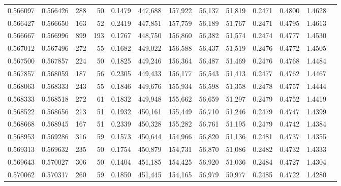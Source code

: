\begin{tabular}{rrrrrrrrrrrrr}
0.566097 & 0.566426 &    288 &    50 &                                     0.1479 & 447,688 & 157,922 &  56,137 &  51,819 & 0.2471 & 0.4800 & 1.4628 \\
0.566427 & 0.566650 &    163 &    52 &                                     0.2419 & 447,851 & 157,759 &  56,189 &  51,767 & 0.2471 & 0.4795 & 1.4613 \\
0.566667 & 0.566996 &    899 &   193 &                                     0.1767 & 448,750 & 156,860 &  56,382 &  51,574 & 0.2474 & 0.4777 & 1.4530 \\
0.567012 & 0.567496 &    272 &    55 &                                     0.1682 & 449,022 & 156,588 &  56,437 &  51,519 & 0.2476 & 0.4772 & 1.4505 \\
0.567500 & 0.567857 &    224 &    50 &                                     0.1825 & 449,246 & 156,364 &  56,487 &  51,469 & 0.2476 & 0.4768 & 1.4484 \\
0.567857 & 0.568059 &    187 &    56 &                                     0.2305 & 449,433 & 156,177 &  56,543 &  51,413 & 0.2477 & 0.4762 & 1.4467 \\
0.568063 & 0.568333 &    243 &    55 &                                     0.1846 & 449,676 & 155,934 &  56,598 &  51,358 & 0.2478 & 0.4757 & 1.4444 \\
0.568333 & 0.568518 &    272 &    61 &                                     0.1832 & 449,948 & 155,662 &  56,659 &  51,297 & 0.2479 & 0.4752 & 1.4419 \\
0.568522 & 0.568656 &    213 &    51 &                                     0.1932 & 450,161 & 155,449 &  56,710 &  51,246 & 0.2479 & 0.4747 & 1.4399 \\
0.568668 & 0.568945 &    167 &    51 &                                     0.2339 & 450,328 & 155,282 &  56,761 &  51,195 & 0.2479 & 0.4742 & 1.4384 \\
0.568953 & 0.569286 &    316 &    59 &                                     0.1573 & 450,644 & 154,966 &  56,820 &  51,136 & 0.2481 & 0.4737 & 1.4355 \\
0.569313 & 0.569632 &    235 &    50 &                                     0.1754 & 450,879 & 154,731 &  56,870 &  51,086 & 0.2482 & 0.4732 & 1.4333 \\
0.569643 & 0.570027 &    306 &    50 &                                     0.1404 & 451,185 & 154,425 &  56,920 &  51,036 & 0.2484 & 0.4727 & 1.4304 \\
0.570062 & 0.570317 &    260 &    59 &                                     0.1850 & 451,445 & 154,165 &  56,979 &  50,977 & 0.2485 & 0.4722 & 1.4280 \\

\end{tabular}
